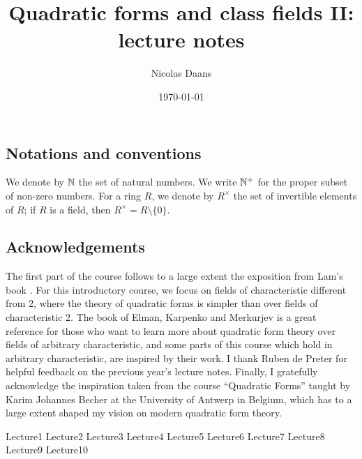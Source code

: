 \documentclass[12pt, leqno, british]{amsart}
\title{Quadratic forms and class fields II: lecture notes}
\author{Nicolas Daans}
\date{\today}
\begin{document}
\maketitle
\tableofcontents

\subsection*{Notations and conventions}
We denote by $\mathbb N$ the set of natural numbers.
We write $\mathbb N^+$ for the proper subset of non-zero numbers.
For a ring $R$, we denote by $R^\times$ the set of invertible elements of $R$; if $R$ is a field, then $R^\times = R \setminus \lbrace 0 \rbrace$.

\subsection*{Acknowledgements}
The first part of the course follows to a large extent the exposition from Lam's book \autocite{Lam}.
For this introductory course, we focus on fields of characteristic different from $2$, where the theory of quadratic forms is simpler than over fields of characteristic $2$.
The book of Elman, Karpenko and Merkurjev \autocite{ElmanKarpenkoMerkurjev} is a great reference for those who want to learn more about quadratic form theory over fields of arbitrary characteristic, and some parts of this course which hold in arbitrary characteristic, are inspired by their work.
I thank Ruben de Preter for helpful feedback on the previous year's lecture notes.
Finally, I gratefully acknowledge the inspiration taken from the course ``Quadratic Forms'' taught by Karim Johannes Becher at the University of Antwerp in Belgium, which has to a large extent shaped my vision on modern quadratic form theory.

{Lecture1}
{Lecture2}
{Lecture3}
{Lecture4}
{Lecture5}
{Lecture6}
{Lecture7}
{Lecture8}
{Lecture9}
{Lecture10}

\printindex
\printbibliography
\end{document}
